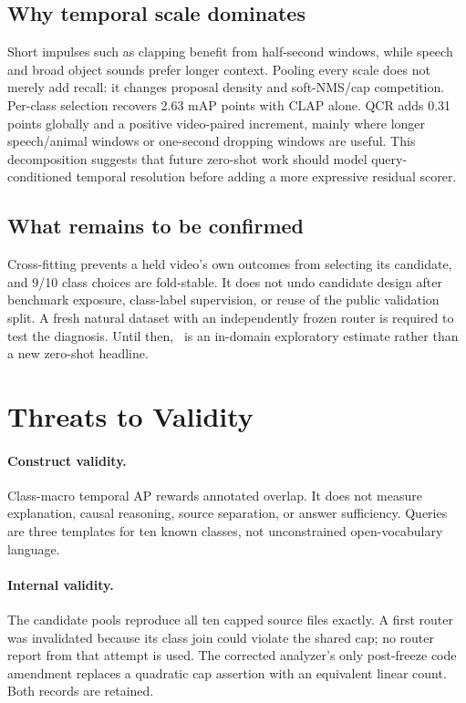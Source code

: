 \documentclass[journal,10pt]{IEEEtran}
\begin{document}
\subsection{Why temporal scale dominates}
Short impulses such as clapping benefit from half-second windows, while
speech and broad object sounds prefer longer context. Pooling every scale
does not merely add recall: it changes proposal density and soft-NMS/cap
competition. Per-class selection recovers 2.63 mAP points with CLAP alone.
QCR adds 0.31 points globally and a positive video-paired increment, mainly
where longer speech/animal windows or one-second dropping windows are useful.
This decomposition suggests that future zero-shot work should model
query-conditioned temporal resolution before adding a more expressive
residual scorer.

\subsection{What remains to be confirmed}
Cross-fitting prevents a held video's own outcomes from selecting its
candidate, and 9/10 class choices are fold-stable. It does not undo candidate
design after benchmark exposure, class-label supervision, or reuse of the
public validation split. A fresh natural dataset with an independently frozen
router is required to test the diagnosis. Until then, \RouterMAP\ is an
in-domain exploratory estimate rather than a new zero-shot headline.

\section{Threats to Validity}
\paragraph{Construct validity.}
Class-macro temporal AP rewards annotated overlap. It does not measure
explanation, causal reasoning, source separation, or answer sufficiency.
Queries are three templates for ten known classes, not unconstrained
open-vocabulary language.

\paragraph{Internal validity.}
The candidate pools reproduce all ten capped source files exactly. A first
router was invalidated because its class join could violate the shared cap;
no router report from that attempt is used. The corrected analyzer's only
post-freeze code amendment replaces a quadratic cap assertion with an
equivalent linear count. Both records are retained.
\end{document}
